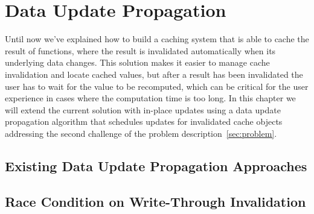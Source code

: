 \chapter{Data Update Propagation}
\label{chapter:data-update-propagation}

Until now we've explained how to build a caching system that is able to cache the result of functions, where the result is invalidated automatically when its underlying data changes. This solution makes it easier to manage cache invalidation and locate cached values, but after a result has been invalidated the user has to wait for the value to be recomputed, which can be critical for the user experience in cases where the computation time is too long.
In this chapter we will extend the current solution with in-place updates using a data update propagation algorithm that schedules updates for invalidated cache objects addressing the second challenge of the problem description~\ref{sec:problem}.


\section{Existing Data Update Propagation Approaches}
\label{sec:existing-data-update-propagation-approaches}





\section{Race Condition on Write-Through Invalidation}
\label{sec:race-condition-on-write-through-invalidation}

